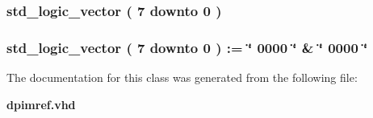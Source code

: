 \subsubsection[{st\-Epp\-Next}]{ {\bfseries \textcolor{comment}{std\-\_\-logic\-\_\-vector}\textcolor{vhdlchar}{ }\textcolor{vhdlchar}{(}\textcolor{vhdlchar}{ }\textcolor{vhdlchar}{ } \textcolor{vhdldigit}{7} \textcolor{vhdlchar}{ }\textcolor{vhdlchar}{ }\textcolor{vhdlchar}{ }\textcolor{vhdlkeyword}{downto}\textcolor{vhdlchar}{ }\textcolor{vhdlchar}{ }\textcolor{vhdlchar}{ } \textcolor{vhdldigit}{0} \textcolor{vhdlchar}{ }\textcolor{vhdlchar}{)}\textcolor{vhdlchar}{ }} \hspace{0.3cm}{\ttfamily [Signal]}}\label{classdpimref_1_1_behavioral_abd71d7bc70a937a0ba2d6eb0c3723d38}
\subsubsection[{st\-Epp\-Ready}]{ {\bfseries \textcolor{comment}{std\-\_\-logic\-\_\-vector}\textcolor{vhdlchar}{ }\textcolor{vhdlchar}{(}\textcolor{vhdlchar}{ }\textcolor{vhdlchar}{ } \textcolor{vhdldigit}{7} \textcolor{vhdlchar}{ }\textcolor{vhdlchar}{ }\textcolor{vhdlchar}{ }\textcolor{vhdlkeyword}{downto}\textcolor{vhdlchar}{ }\textcolor{vhdlchar}{ }\textcolor{vhdlchar}{ } \textcolor{vhdldigit}{0} \textcolor{vhdlchar}{ }\textcolor{vhdlchar}{)}\textcolor{vhdlchar}{ }\textcolor{vhdlchar}{ }\textcolor{vhdlchar}{\-:}\textcolor{vhdlchar}{=}\textcolor{vhdlchar}{ }\textcolor{keyword}{\char`\"{} 0000 \char`\"{}}\textcolor{vhdlchar}{ }\textcolor{vhdlchar}{ }\textcolor{vhdlchar}{\&}\textcolor{vhdlchar}{ }\textcolor{keyword}{\char`\"{} 0000 \char`\"{}}\textcolor{vhdlchar}{ }} \hspace{0.3cm}{\ttfamily [Constant]}}\label{classdpimref_1_1_behavioral_aaedbd5993a954b3fba70aeb966435b21}


The documentation for this class was generated from the following file\-:\begin{DoxyCompactItemize}
\item 
{\bf dpimref.\-vhd}\end{DoxyCompactItemize}
